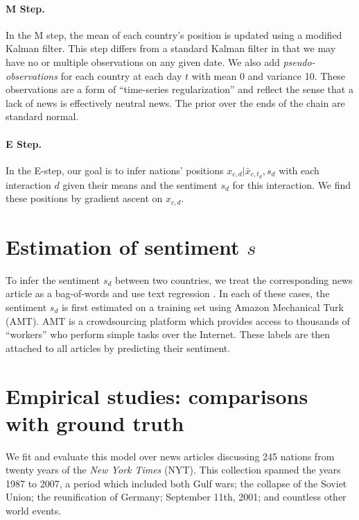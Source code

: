 \paragraph{M Step.} In the M step, the mean of each country's position
is updated using a modified Kalman filter.  This step differs from a
standard Kalman filter in that we may have no or multiple observations
on any given date.  We also add \emph{pseudo-observations} for each
country at each day $t$ with mean 0 and variance 10.  These
observations are a form of ``time-series regularization'' and reflect
the sense that a lack of news is effectively neutral news. The prior
over the ends of the chain are standard normal.

\paragraph{E Step.} In the E-step, our goal is to infer nations'
positions $x_{c,d} | \bar{x}_{c,t_d}, s_d$ with each interaction $d$ given
their means and the sentiment $s_d$ for this interaction.  We find
these positions by gradient ascent on $x_{c,d}$.

\section{Estimation of sentiment $s$}
\label{section:sentiment_models}
To infer the sentiment $s_d$ between two countries, we treat the
corresponding news article as a bag-of-words and use text regression
\cite{kogan:2009}.  In each of these cases, the sentiment $s_d$ is
first estimated on a training set using Amazon Mechanical Turk (AMT).
AMT is a crowdsourcing platform which provides access to thousands of
``workers'' who perform simple tasks over the Internet.  These labels
are then attached to all articles by predicting their sentiment.

\section{Empirical studies: comparisons with ground truth}

\label{section:experiments}

We fit and evaluate this model over news articles discussing 245
nations from twenty years of the \emph{New York Times} (NYT).  This
collection spanned the years 1987 to 2007, a period which included
both Gulf wars; the collapse of the Soviet Union; the reunification of
Germany; September 11th, 2001; and countless other world events.


